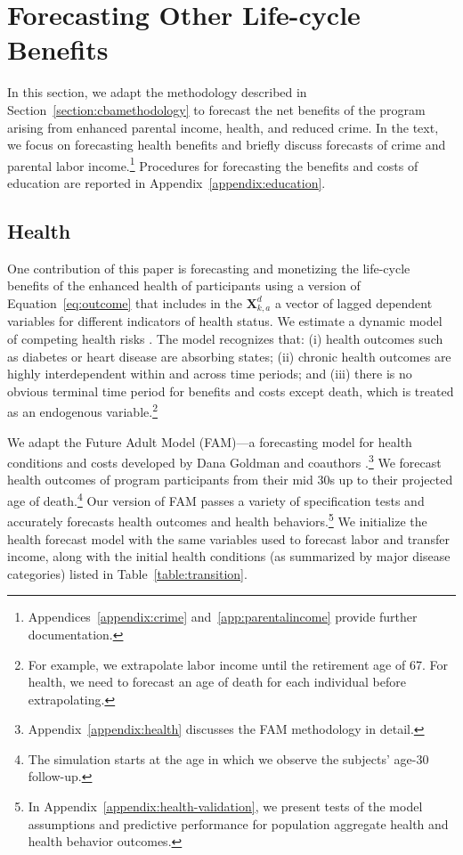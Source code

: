 \section{Forecasting Other Life-cycle Benefits} \label{section:cbapractice}

\noindent In this section, we adapt the methodology described in Section~\ref{section:cbamethodology} to forecast the net benefits of the program arising from enhanced parental income, health, and reduced crime. In the text, we focus on forecasting health benefits and briefly discuss forecasts of crime and parental labor income.\footnote{Appendices~\ref{appendix:crime} and~\ref{app:parentalincome} provide further documentation.} Procedures for forecasting the benefits and costs of education are reported in Appendix~\ref{appendix:education}.

\subsection{Health}

\noindent One contribution of this paper is forecasting and monetizing the life-cycle benefits of the enhanced health of participants using a version of Equation~\eqref{eq:outcome} that includes in the $\bm{X}^d_{k,a}$ a vector of lagged dependent variables for different indicators of health status. We estimate a dynamic model of competing health risks \citep{Kalbfleisch_Prentice_1980_failure}. The model recognizes that: (i) health outcomes such as diabetes or heart disease are absorbing states; (ii) chronic health outcomes are highly interdependent within and across time periods; and (iii) there is no obvious terminal time period for benefits and costs except death, which is treated as an endogenous variable.\footnote{For example, we extrapolate labor income until the retirement age of 67. For health, we need to forecast an age of death for each individual before extrapolating.}

We adapt the Future Adult Model (FAM)---a forecasting model for health conditions and costs developed by Dana Goldman and coauthors \citep{Goldman_etal_2015_Future-Elderly-Model-Report}.\footnote{Appendix~\ref{appendix:health} discusses the FAM methodology in detail.} We forecast health outcomes of program participants from their mid 30s up to their projected age of death.\footnote{The simulation starts at the age in which we observe the subjects' age-30 follow-up.} Our version of FAM passes a variety of specification tests and accurately forecasts health outcomes and health behaviors.\footnote{In Appendix~\ref{appendix:health-validation}, we present tests of the model assumptions and predictive performance for population aggregate health and health behavior outcomes.} We initialize the health forecast model with the same variables used to forecast labor and transfer income, along with the initial health conditions (as summarized by major disease categories) listed in Table~\ref{table:transition}.

